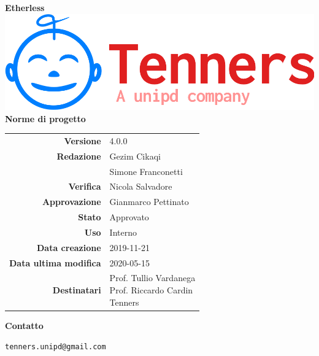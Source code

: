 \begin{titlepage}
	\begin{center}
		\large \textbf{Etherless}
		\vfill
		\includegraphics[scale = 0.3]{./res/img/logo.png}\\
		\vfill
		\Huge \textbf{Norme di progetto}

        \vfill
        \large

        \begin{tabular}{r|l}
                        \textbf{Versione} & 4.0.0 \\
                        \textbf{Redazione} &
                        Gezim Cikaqi \\&
												Simone Franconetti\\
                        \textbf{Verifica} &
                        Nicola Salvadore \\
                        \textbf{Approvazione} & Gianmarco Pettinato\\
                        \textbf{Stato} & Approvato \\
                        \textbf{Uso} &  Interno\\
                        \textbf{Data creazione} &  2019-11-21\\
                        \textbf{Data ultima modifica} & 2020-05-15\\
                        \textbf{Destinatari} & \parbox[t]{5cm}{Prof. Tullio Vardanega\\Prof. Riccardo Cardin\\Tenners}
                \end{tabular}
                \vfill
                \normalsize
                \vfill
                \textbf{Contatto}

                \texttt{tenners.unipd@gmail.com}

	\end{center}
\end{titlepage}
